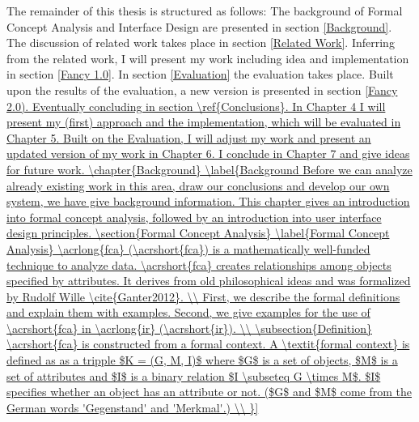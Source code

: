 \documentclass[11pt]{report}
\begin{document}
 The remainder of this thesis is structured as follows: The background of Formal Concept Analysis and Interface Design are presented in section \ref{Background}. The discussion of related work takes place in section \ref{Related Work}. Inferring from the related work, I will present my work including idea and implementation in section \ref{Fancy 1.0}. In section \ref{Evaluation} the evaluation takes place. Built upon the results of the evaluation, a new version is presented in section \ref{Fancy 2.0). Eventually concluding in section \ref{Conclusions}.
 
 
 In Chapter 4 I will present my (first) approach and the implementation, which will be evaluated in Chapter 5. Built on the Evaluation, I will adjust my work and present an updated version of my work in Chapter 6. I conclude in Chapter 7 and give ideas for future work.
 
\chapter{Background}
\label{Background

Before we can analyze already existing work in this area, draw our conclusions and develop our own system, we have give background information. This chapter gives an introduction into formal concept analysis, followed by an introduction into user interface design principles.

\section{Formal Concept Analysis}
\label{Formal Concept Analysis}

\acrlong{fca} (\acrshort{fca}) is a mathematically well-funded technique to analyze data. \acrshort{fca} creates relationships among objects specified by attributes. It derives from old philosophical ideas and was formalized by Rudolf Wille \cite{Ganter2012}. \\

First, we describe the formal definitions and explain them with examples. Second, we give examples for the use of \acrshort{fca} in \acrlong{ir} (\acrshort{ir}). \\

\subsection{Definition}

\acrshort{fca} is constructed from a formal context. A \textit{formal context} is defined as as a tripple $K = (G, M, I)$ where $G$ is a set of objects, $M$ is a set of attributes and $I$ is a binary relation $I \subseteq G \times M$. $I$ specifies whether an object has an attribute or not. ($G$ and $M$ come from the German words 'Gegenstand' and 'Merkmal'.) \\

}}
\end{document}
